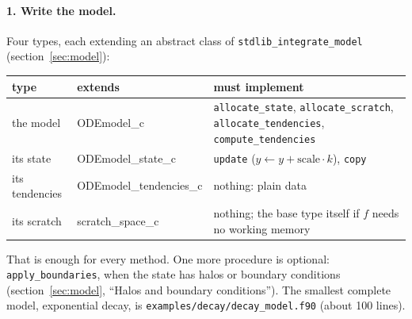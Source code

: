 \documentclass[11pt,a4paper]{article}
\newcommand{\code}[1]{\texttt{#1}}
\begin{document}
\paragraph{1. Write the model.} Four types, each extending an abstract class
of \code{stdlib\_integrate\_model} (section~\ref{sec:model}):
\begin{center}
\renewcommand{\arraystretch}{1.2}
\begin{tabular}{l >{\ttfamily}l p{7.4cm}}
  \toprule
  type & \normalfont extends & must implement \\
  \midrule
  the model      & ODEmodel\_c            & \code{allocate\_state}, \code{allocate\_scratch},
                                            \code{allocate\_tendencies}, \code{compute\_tendencies} \\
  its state      & ODEmodel\_state\_c     & \code{update} ($y \leftarrow y + \text{scale}\cdot k$),
                                            \code{copy} \\
  its tendencies & ODEmodel\_tendencies\_c & nothing: plain data \\
  its scratch    & scratch\_space\_c      & nothing; the base type itself if $f$ needs no
                                            working memory \\
  \bottomrule
\end{tabular}
\end{center}
That is enough for every method. One more procedure is optional:
\code{apply\_boundaries}, when the state has halos or boundary conditions
(section~\ref{sec:model}, ``Halos and boundary conditions''). The smallest
complete model, exponential decay, is \code{examples/decay/decay\_model.f90}
(about 100 lines).
\end{document}
